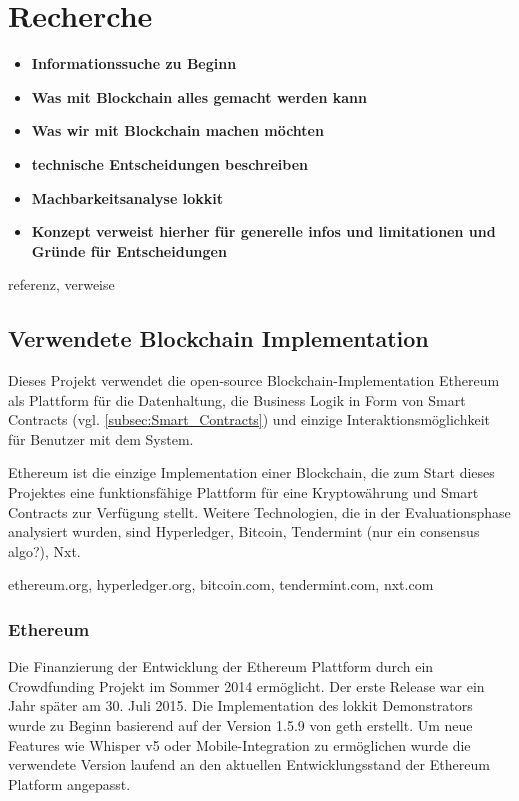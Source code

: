 \section{Recherche}
\label{sec:Recherche}
\begin{itemize}
    \item \textbf{Informationssuche zu Beginn}
    \item \textbf{Was mit Blockchain alles gemacht werden kann}
    \item \textbf{Was wir mit Blockchain machen möchten}
    \item \textbf{technische Entscheidungen beschreiben}
    \item \textbf{Machbarkeitsanalyse lokkit}
    \item \textbf{Konzept verweist hierher für generelle infos und limitationen und Gründe für Entscheidungen}
\end{itemize}

referenz, verweise

\subsection{Verwendete Blockchain Implementation}
Dieses Projekt verwendet die open-source Blockchain-Implementation Ethereum als Plattform für die Datenhaltung, die Business Logik in Form von Smart Contracts (vgl. \ref{subsec:Smart_Contracts}) und einzige Interaktionsmöglichkeit für Benutzer mit dem System.

Ethereum ist die einzige Implementation einer Blockchain, die zum Start dieses Projektes eine funktionsfähige Plattform für eine Kryptowährung und Smart Contracts zur Verfügung stellt. Weitere Technologien, die in der Evaluationsphase analysiert wurden, sind Hyperledger, Bitcoin, Tendermint (nur ein consensus algo?), Nxt.\cite{ethereum.org, hyperledger.org}

ethereum.org, hyperledger.org, bitcoin.com, tendermint.com, nxt.com

\subsubsection{Ethereum}
Die Finanzierung der Entwicklung der Ethereum Plattform durch ein Crowdfunding Projekt im Sommer 2014 ermöglicht. Der erste Release war ein Jahr später am 30. Juli 2015. Die Implementation des lokkit Demonstrators wurde zu Beginn basierend auf der Version 1.5.9 von geth erstellt. Um neue Features wie Whisper v5 oder Mobile-Integration zu ermöglichen wurde die verwendete Version laufend an den aktuellen Entwicklungsstand der Ethereum Platform angepasst.\cite{ethereum.org}

